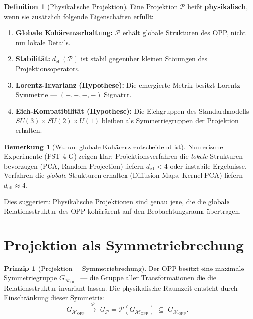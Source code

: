 \documentclass[11pt,a4paper]{article}
\theoremstyle{plain}
\theoremstyle{definition}
\newtheorem{definition}{Definition}[section]
\newtheorem{remark}{Bemerkung}[section]
\newtheorem{prinzip}{Prinzip}[section]
\newcommand{\OPP}{\mathcal{M}_{\mathrm{OPP}}}
\newcommand{\deff}{d_{\mathrm{eff}}}
\newcommand{\Proj}{\mathcal{P}}
\begin{document}
\begin{definition}[Physikalische Projektion]
Eine Projektion $\Proj$ hei\ss{}t \textbf{physikalisch}, wenn sie
zus\"{a}tzlich folgende Eigenschaften erf\"{u}llt:
\begin{enumerate}
  \item \textbf{Globale Kohärenzerhaltung:} $\Proj$ erh\"{a}lt globale
        Strukturen des OPP, nicht nur lokale Details.
  \item \textbf{Stabilit\"{a}t:} $\deff(\Proj)$ ist stabil gegen\"{u}ber
        kleinen St\"{o}rungen des Projektionsoperators.
  \item \textbf{Lorentz-Invarianz (Hypothese):} Die emergierte Metrik
        besitzt Lorentz-Symmetrie --- $(+,-,-,-)$ Signatur.
  \item \textbf{Eich-Kompatibilit\"{a}t (Hypothese):} Die Eichgruppen
        des Standardmodells $SU(3) \times SU(2) \times U(1)$ bleiben
        als Symmetriegruppen der Projektion erhalten.
\end{enumerate}
\end{definition}

\begin{remark}[Warum globale Kohärenz entscheidend ist]
Numerische Experimente (PST-4-G) zeigen klar: Projektionsverfahren
die \emph{lokale} Strukturen bevorzugen (PCA, Random Projection) liefern
$\deff < 4$ oder instabile Ergebnisse. Verfahren die
\emph{globale} Strukturen erhalten (Diffusion Maps, Kernel PCA) liefern
$\deff \approx 4$.

Dies suggeriert: Physikalische Projektionen sind genau jene, die die
globale Relationsstruktur des OPP kohär\"{a}rent auf den Beobachtungsraum
\"{u}bertragen.
\end{remark}

\section{Projektion als Symmetriebrechung}

\begin{prinzip}[Projektion = Symmetriebrechung]
Der OPP besitzt eine maximale Symmetriegruppe $G_{\OPP}$ ---
die Gruppe aller Transformationen die die Relationsstruktur invariant
lassen. Die physikalische Raumzeit entsteht durch Einschr\"{a}nkung
dieser Symmetrie:
\[
  G_{\OPP} \;\xrightarrow{\Proj}\; G_\Proj
  = \Proj(G_{\OPP}) \;\subseteq\; G_{\OPP}.
\]
\end{prinzip}
\end{document}
